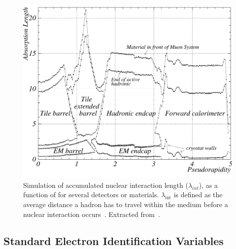   \begin{figure}[ht]
  \centering
  \includegraphics[width=.5\textwidth]{sections/context/figures/cal_had_lambda.pdf}
  \caption{Simulation of accumulated nuclear interaction length ($\lambda_{int}$),
    as a function of \abseta{} for several detectors or materials.
  $\lambda_{\text{int}}$ is defined as the average distance a hadron has to
  travel within the medium before a nuclear interaction
  occurs~\cite{Wigmans2017}. Extracted from~\cite{cal_tdr}.}%
  \label{fig:cal_had_lambda}
\end{figure}










\subsection{Standard Electron Identification Variables}\label{ssec:std_variables}

